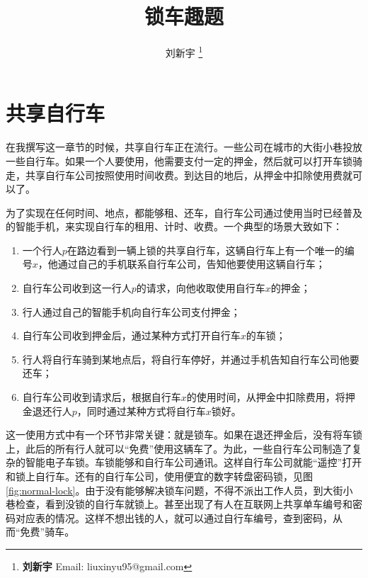 \documentclass[UTF8]{article}
\begin{document}

\title{锁车趣题}

\author{刘新宇
\thanks{{\bfseries 刘新宇} \newline
  Email: liuxinyu95@gmail.com \newline}
  }

\maketitle
\fi


\section{共享自行车}

在我撰写这一章节的时候，共享自行车正在流行。一些公司在城市的大街小巷投放一些自行车。如果一个人要使用，他需要支付一定的押金，然后就可以打开车锁骑走，共享自行车公司按照使用时间收费。到达目的地后，从押金中扣除使用费就可以了。

为了实现在任何时间、地点，都能够租、还车，自行车公司通过使用当时已经普及的智能手机，来实现自行车的租用、计时、收费。一个典型的场景大致如下：

\begin{enumerate}
\item 一个行人$p$在路边看到一辆上锁的共享自行车，这辆自行车上有一个唯一的编号$x$，他通过自己的手机联系自行车公司，告知他要使用这辆自行车；
\item 自行车公司收到这一行人$p$的请求，向他收取使用自行车$x$的押金；
\item 行人通过自己的智能手机向自行车公司支付押金；
\item 自行车公司收到押金后，通过某种方式打开自行车$x$的车锁；
\item 行人将自行车骑到某地点后，将自行车停好，并通过手机告知自行车公司他要还车；
\item 自行车公司收到请求后，根据自行车$x$的使用时间，从押金中扣除费用，将押金退还行人$p$，同时通过某种方式将自行车$x$锁好。
\end{enumerate}

这一使用方式中有一个环节非常关键：就是锁车。如果在退还押金后，没有将车锁上，此后的所有行人就可以“免费”使用这辆车了。为此，一些自行车公司制造了复杂的智能电子车锁。车锁能够和自行车公司通讯。这样自行车公司就能“遥控”打开和锁上自行车。还有的自行车公司，使用便宜的数字转盘密码锁，见图\cref{fig:normal-lock}。由于没有能够解决锁车问题，不得不派出工作人员，到大街小巷检查，看到没锁的自行车就锁上。甚至出现了有人在互联网上共享单车编号和密码对应表的情况。这样不想出钱的人，就可以通过自行车编号，查到密码，从而“免费”骑车。
\end{document}
